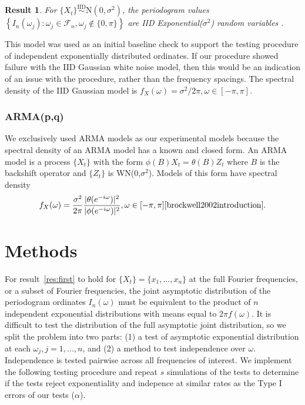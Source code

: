 \documentclass{article}\usepackage{graphicx, color}
\newcommand{\mj}[1]{{\color{blue} #1}}
\theoremstyle{plain}
\newtheorem{res}{Result}
\begin{document}
\begin{res}
For $\{X_t\} \stackrel{\text{IID}}{\sim} \text{N}(0,\sigma^2)$, the periodogram values $\left\{ I_n(\omega_j): \omega_j \in \mathcal{F}_n, \omega_j \not\in \{0,\pi\} \right\}$ are IID Exponential($\sigma^2$) random variables \cite{brockwell2002introduction}.
\end{res}

This model was used as an initial baseline check to support the testing procedure of independent exponentially distributed ordinates. If our procedure showed failure with the IID Gaussian white noise model, then this would be an indication of an issue with the procedure, rather than the frequency spacings. The spectral density of the IID Gaussian model is $f_X(\omega) = \sigma^2/2\pi, \omega \in [-\pi, \pi]$.

\subsubsection*{ARMA(p,q)}
We exclusively used ARMA models as our experimental models because the spectral density of an ARMA model has a known and closed form. An ARMA model is a process $\{X_t\}$ with the form $\phi(B)X_t = \theta(B)Z_t$ where $B$ is the backshift operator and $\{Z_t\}$ is WN(0,$\sigma^2$). Models of this form have spectral density
\begin{align}
f_X(\omega) = \frac{\sigma^2}{2\pi} \frac{|\theta(e^{-i \omega})|^2}{|\phi(e^{-i \omega})|^2}, \omega \in [-\pi, \pi] \text{\cite{brockwell2002introduction}}.
\end{align}



\section{Methods}


For result~\ref{res:first} to hold for $\{X_t\}=\{x_1,...,x_n\}$ at the full Fourier frequencies, or a subset of Fourier frequencies, the joint asymptotic distribution of the periodogram ordinates $I_n(\omega)$ must be equivalent to the product of $n$ independent exponential distributions with means equal to $2\pi f(\omega)$. It is difficult to test the distribution of the full asymptotic joint distribution, so we split the problem into two parts: (1) a test of asymptotic exponential distribution at each $\omega_j, j=1,...,n$, and (2) a method to test independence over $\omega$. Independence is tested pairwise across all frequencies of interest. We implement the following testing procedure and repeat $s$ simulations of the tests to determine if the tests reject exponentiality and indepence at similar rates as the Type I errors of our tests ($\alpha$).
\end{document}
